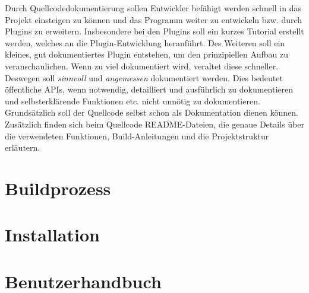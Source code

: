 Durch Quellcodedokumentierung sollen Entwickler befähigt werden schnell in das Projekt einsteigen zu können und das Programm weiter zu entwickeln bzw. durch Plugins zu erweitern.
Insbesondere bei den Plugins soll ein kurzes Tutorial erstellt werden, welches an die Plugin-Entwicklung heranführt. 
Des Weiteren soll ein kleines, gut dokumentiertes Plugin entstehen, um den prinzipiellen Aufbau zu veranschaulichen.
Wenn zu viel dokumentiert wird, veraltet diese schneller.
Deswegen soll \emph{sinnvoll} und \emph{angemessen} dokumentiert werden.
Dies bedeutet öffentliche APIs, wenn notwendig, detailliert und ausführlich zu dokumentieren und selbsterklärende Funktionen etc. nicht unnötig zu dokumentieren.
Grundsätzlich soll der Quellcode selbst schon als Dokumentation dienen können.
Zusätzlich finden sich beim Quellcode README-Dateien, die genaue Details über die verwendeten Funktionen, Build-Anleitungen und die Projektstruktur erläutern.

\section{Buildprozess}

\section{Installation}

\section{Benutzerhandbuch}
































